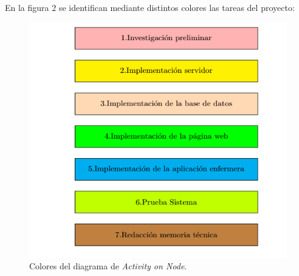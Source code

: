 \documentclass[
11pt, %
]{charter}
\begin{document}


En la figura 2 se identifican mediante distintos colores las tareas del proyecto:

\begin{figure}[htpb]
\centering 
\includegraphics[width=.8\textwidth]{./Figuras/AoN-2.png}
\caption{Colores del diagrama de \textit{Activity on Node}.}
\label{fig:AoN0}

\end{figure}
\end{document}
